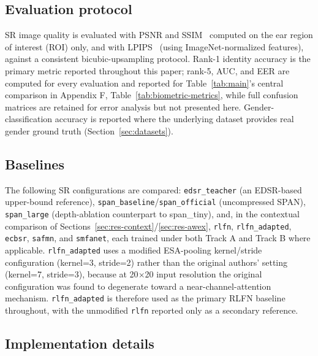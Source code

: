 \documentclass[pdflatex,sn-vancouver-num]{sn-jnl}
\begin{document}
\subsection{Evaluation protocol}

SR image quality is evaluated with PSNR and SSIM~\cite{wang2004ssim} computed on the ear region of interest (ROI) only, and with LPIPS~\cite{zhang2018lpips} (using ImageNet-normalized features), against a consistent bicubic-upsampling protocol. Rank-1 identity accuracy is the primary metric reported throughout this paper; rank-5, AUC, and EER are computed for every evaluation and reported for Table~\ref{tab:main}'s central comparison in Appendix F, Table~\ref{tab:biometric-metrics}, while full confusion matrices are retained for error analysis but not presented here. Gender-classification accuracy is reported where the underlying dataset provides real gender ground truth (Section~\ref{sec:datasets}).

\subsection{Baselines}

The following SR configurations are compared: \texttt{edsr\_teacher} (an EDSR-based~\cite{lim2017edsr} upper-bound reference), \texttt{span\_baseline}/\texttt{span\_official} (uncompressed SPAN), \texttt{span\_large} (depth-ablation counterpart to span\_tiny), and, in the contextual comparison of Sections~\ref{sec:res-context}/\ref{sec:res-awex}, \texttt{rlfn}, \texttt{rlfn\_adapted}, \texttt{ecbsr}, \texttt{safmn}, and \texttt{smfanet}, each trained under both Track A and Track B where applicable. \texttt{rlfn\_adapted} uses a modified ESA-pooling kernel/stride configuration (kernel=3, stride=2) rather than the original authors' setting (kernel=7, stride=3), because at 20$\times$20 input resolution the original configuration was found to degenerate toward a near-channel-attention mechanism. \texttt{rlfn\_adapted} is therefore used as the primary RLFN baseline throughout, with the unmodified \texttt{rlfn} reported only as a secondary reference.

\subsection{Implementation details}
\label{sec:impl}
\end{document}
